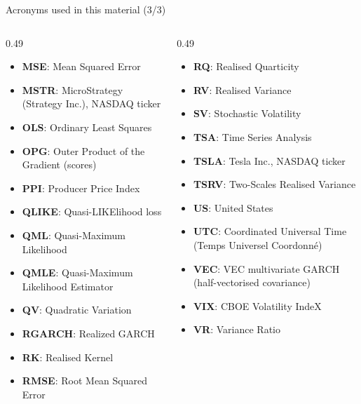 \begin{frame}{Acronyms used in this material (3/3)}
\begin{columns}[T]
\begin{column}{0.49\textwidth}
\begin{itemize}\setlength{\itemsep}{0pt}
    \item \textbf{MSE}: Mean Squared Error
    \item \textbf{MSTR}: MicroStrategy (Strategy Inc.), NASDAQ ticker
    \item \textbf{OLS}: Ordinary Least Squares
    \item \textbf{OPG}: Outer Product of the Gradient (scores)
    \item \textbf{PPI}: Producer Price Index
    \item \textbf{QLIKE}: Quasi-LIKElihood loss
    \item \textbf{QML}: Quasi-Maximum Likelihood
    \item \textbf{QMLE}: Quasi-Maximum Likelihood Estimator
    \item \textbf{QV}: Quadratic Variation
    \item \textbf{RGARCH}: Realized GARCH
    \item \textbf{RK}: Realised Kernel
    \item \textbf{RMSE}: Root Mean Squared Error
\end{itemize}
\end{column}
\begin{column}{0.49\textwidth}
\begin{itemize}\setlength{\itemsep}{0pt}
    \item \textbf{RQ}: Realised Quarticity
    \item \textbf{RV}: Realised Variance
    \item \textbf{SV}: Stochastic Volatility
    \item \textbf{TSA}: Time Series Analysis
    \item \textbf{TSLA}: Tesla Inc., NASDAQ ticker
    \item \textbf{TSRV}: Two-Scales Realised Variance
    \item \textbf{US}: United States
    \item \textbf{UTC}: Coordinated Universal Time (Temps Universel Coordonné)
    \item \textbf{VEC}: VEC multivariate GARCH (half-vectorised covariance)
    \item \textbf{VIX}: CBOE Volatility IndeX
    \item \textbf{VR}: Variance Ratio
\end{itemize}
\end{column}
\end{columns}
\end{frame}

